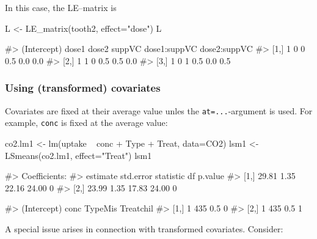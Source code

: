 In this case, the LE--matrix is

\begin{Schunk}
\begin{Sinput}
L <- LE_matrix(tooth2, effect="dose")
L
\end{Sinput}
\begin{Soutput}
#>      (Intercept) dose1 dose2 suppVC dose1:suppVC dose2:suppVC
#> [1,]           1     0     0    0.5          0.0          0.0
#> [2,]           1     1     0    0.5          0.5          0.0
#> [3,]           1     0     1    0.5          0.0          0.5
\end{Soutput}
\end{Schunk}

\hypertarget{using-transformed-covariates}{%
\subsubsection{Using (transformed)
covariates}\label{using-transformed-covariates}}

Covariates are fixed at their average value unles the
\texttt{at=...}-argument is used. For example, \texttt{conc} is fixed at
the average value:

\begin{Schunk}
\begin{Sinput}
co2.lm1 <- lm(uptake ~ conc + Type + Treat, data=CO2)
lsm1 <- LSmeans(co2.lm1, effect="Treat")
lsm1
\end{Sinput}
\begin{Soutput}
#> Coefficients:
#>      estimate std.error statistic    df p.value
#> [1,]    29.81      1.35     22.16 24.00       0
#> [2,]    23.99      1.35     17.83 24.00       0
\end{Soutput}
\begin{Soutput}
#>      (Intercept) conc TypeMis Treatchil
#> [1,]           1  435     0.5         0
#> [2,]           1  435     0.5         1
\end{Soutput}
\end{Schunk}

A special issue arises in connection with transformed covariates.
Consider:

